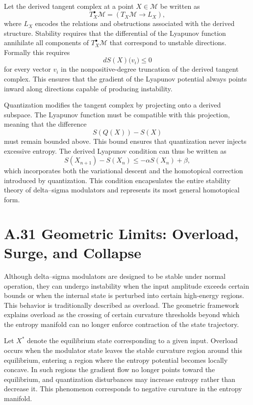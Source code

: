 Let the derived tangent complex at a point \(X\in\mathcal{M}\) be written as
\[
T_X^\bullet \mathcal{M} = \left( T_X \mathcal{M} \to L_X \right),
\]
where \(L_X\) encodes the relations and obstructions associated with the derived structure. Stability requires that the differential of the Lyapunov function annihilate all components of \(T_X^\bullet\mathcal{M}\) that correspond to unstable directions. Formally this requires
\[
dS(X)\bigl(v_i\bigr) \le 0
\]
for every vector \(v_i\) in the nonpositive-degree truncation of the derived tangent complex. This ensures that the gradient of the Lyapunov potential always points inward along directions capable of producing instability.

Quantization modifies the tangent complex by projecting onto a derived subspace. The Lyapunov function must be compatible with this projection, meaning that the difference
\[
S(Q(X)) - S(X)
\]
must remain bounded above. This bound ensures that quantization never injects excessive entropy. The derived Lyapunov condition can thus be written as
\[
S(X_{n+1}) - S(X_n) \le -\alpha S(X_n) + \beta,
\]
which incorporates both the variational descent and the homotopical correction introduced by quantization. This condition encapsulates the entire stability theory of delta–sigma modulators and represents its most general homotopical form.

\section{A.31 Geometric Limits: Overload, Surge, and Collapse}

Although delta–sigma modulators are designed to be stable under normal operation, they can undergo instability when the input amplitude exceeds certain bounds or when the internal state is perturbed into certain high-energy regions. This behavior is traditionally described as overload. The geometric framework explains overload as the crossing of certain curvature thresholds beyond which the entropy manifold can no longer enforce contraction of the state trajectory.

Let \(X^\ast\) denote the equilibrium state corresponding to a given input. Overload occurs when the modulator state leaves the stable curvature region around this equilibrium, entering a region where the entropy potential becomes locally concave. In such regions the gradient flow no longer points toward the equilibrium, and quantization disturbances may increase entropy rather than decrease it. This phenomenon corresponds to negative curvature in the entropy manifold.

